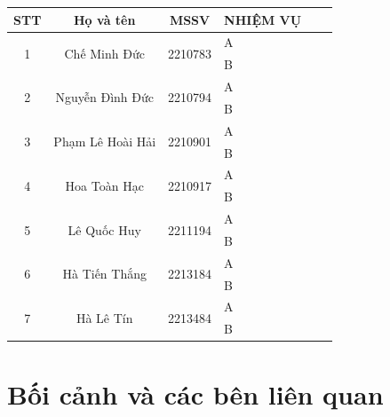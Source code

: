 \documentclass[a4paper]{article}
\begin{document}
\begin{center}
\begin{tabular}{|c|c|c|l|c|c|}
\hline
\textbf{STT} & \textbf{Họ và tên} & \textbf{MSSV} & \textbf{NHIỆM VỤ}\\
\hline 
\multirow{2}{*}{1} & \multirow{2}{*}{Chế Minh Đức} & \multirow{2}{*}{2210783} & A \\
 & &  & B\\
\hline 
\multirow{2}{*}{2} & \multirow{2}{*}{Nguyễn Đình Đức} & \multirow{2}{*}{2210794} & A \\
 & &  & B\\
\hline 
\multirow{2}{*}{3} & \multirow{2}{*}{Phạm Lê Hoài Hải} & \multirow{2}{*}{2210901} & A \\
 & &  & B\\
\hline 
\multirow{2}{*}{4} & \multirow{2}{*}{Hoa Toàn Hạc} & \multirow{2}{*}{2210917} & A \\
 & &  & B\\
\hline 
\multirow{2}{*}{5} & \multirow{2}{*}{Lê Quốc Huy} & \multirow{2}{*}{2211194} & A \\
 & &  & B\\
\hline
\multirow{2}{*}{6} & \multirow{2}{*}{Hà Tiến Thắng} & \multirow{2}{*}{2213184} & A \\
 & &  & B\\
\hline 
\multirow{2}{*}{7} & \multirow{2}{*}{Hà Lê Tín} & \multirow{2}{*}{2213484} & A \\
 & &  & B\\
\hline 
\end{tabular}
\end{center}
\newpage
\tableofcontents
\newpage

\newpage

\section{Bối cảnh và các bên liên quan}
\end{document}
